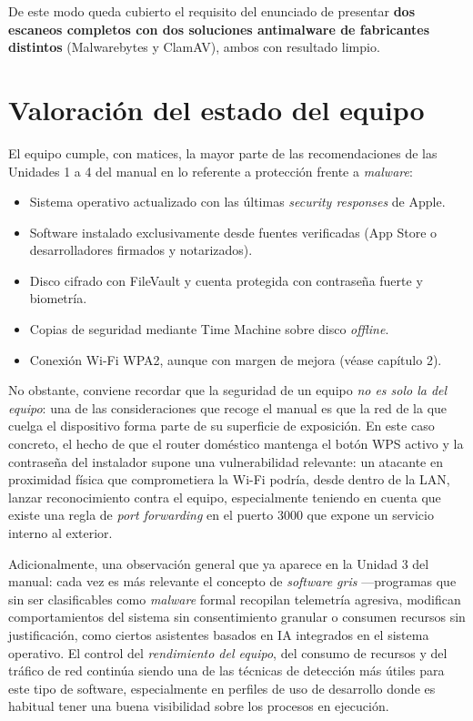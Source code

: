 De este modo queda cubierto el requisito del enunciado de presentar \textbf{dos escaneos completos con dos soluciones antimalware de fabricantes distintos} (Malwarebytes y ClamAV), ambos con resultado limpio.

\section{Valoración del estado del equipo}

El equipo cumple, con matices, la mayor parte de las recomendaciones de las Unidades 1 a 4 del manual en lo referente a protección frente a \textit{malware}:

\begin{itemize}[leftmargin=*]
    \item Sistema operativo actualizado con las últimas \textit{security responses} de Apple.
    \item Software instalado exclusivamente desde fuentes verificadas (App Store o desarrolladores firmados y notarizados).
    \item Disco cifrado con FileVault y cuenta protegida con contraseña fuerte y biometría.
    \item Copias de seguridad mediante Time Machine sobre disco \textit{offline}.
    \item Conexión Wi-Fi WPA2, aunque con margen de mejora (véase capítulo 2).
\end{itemize}

No obstante, conviene recordar que la seguridad de un equipo \emph{no es solo la del equipo}: una de las consideraciones que recoge el manual es que la red de la que cuelga el dispositivo forma parte de su superficie de exposición. En este caso concreto, el hecho de que el router doméstico mantenga el botón WPS activo y la contraseña del instalador supone una vulnerabilidad relevante: un atacante en proximidad física que comprometiera la Wi-Fi podría, desde dentro de la LAN, lanzar reconocimiento contra el equipo, especialmente teniendo en cuenta que existe una regla de \textit{port forwarding} en el puerto 3000 que expone un servicio interno al exterior.

Adicionalmente, una observación general que ya aparece en la Unidad 3 del manual: cada vez es más relevante el concepto de \textit{software gris} ---programas que sin ser clasificables como \textit{malware} formal recopilan telemetría agresiva, modifican comportamientos del sistema sin consentimiento granular o consumen recursos sin justificación, como ciertos asistentes basados en IA integrados en el sistema operativo. El control del \textit{rendimiento del equipo}, del consumo de recursos y del tráfico de red continúa siendo una de las técnicas de detección más útiles para este tipo de software, especialmente en perfiles de uso de desarrollo donde es habitual tener una buena visibilidad sobre los procesos en ejecución.

